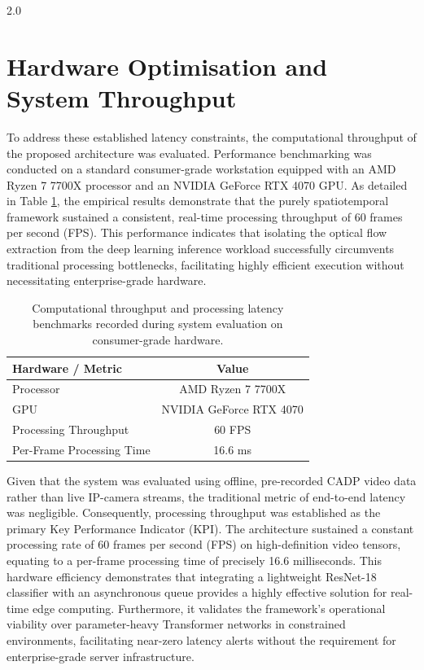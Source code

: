 \begin{spacing}{2.0}
\section{Hardware Optimisation and System Throughput}
To address these established latency constraints, the computational throughput of the proposed architecture was evaluated. Performance benchmarking was conducted on a standard consumer-grade workstation equipped with an AMD Ryzen 7 7700X processor and an NVIDIA GeForce RTX 4070 GPU. As detailed in Table \ref{tab:hardware_benchmarks}, the empirical results demonstrate that the purely spatiotemporal framework sustained a consistent, real-time processing throughput of 60 frames per second (FPS). This performance indicates that isolating the optical flow extraction from the deep learning inference workload successfully circumvents traditional processing bottlenecks, facilitating highly efficient execution without necessitating enterprise-grade hardware.

\begin{table}[H]
    \centering
    \begin{tabular}{l c}
        \toprule
        \textbf{Hardware / Metric} & \textbf{Value} \\
        \midrule
        Processor & AMD Ryzen 7 7700X \\
        GPU & NVIDIA GeForce RTX 4070 \\
        Processing Throughput & 60 FPS \\
        Per-Frame Processing Time & 16.6 ms \\
        \bottomrule
    \end{tabular}
    \caption{Computational throughput and processing latency benchmarks recorded during system evaluation on consumer-grade hardware.}
    \label{tab:hardware_benchmarks}
\end{table}

Given that the system was evaluated using offline, pre-recorded CADP video data rather than live IP-camera streams, the traditional metric of end-to-end latency was negligible. Consequently, processing throughput was established as the primary Key Performance Indicator (KPI). The architecture sustained a constant processing rate of 60 frames per second (FPS) on high-definition video tensors, equating to a per-frame processing time of precisely 16.6 milliseconds. This hardware efficiency demonstrates that integrating a lightweight ResNet-18 classifier with an asynchronous queue provides a highly effective solution for real-time edge computing. Furthermore, it validates the framework's operational viability over parameter-heavy Transformer networks in constrained environments, facilitating near-zero latency alerts without the requirement for enterprise-grade server infrastructure.


\end{spacing}
